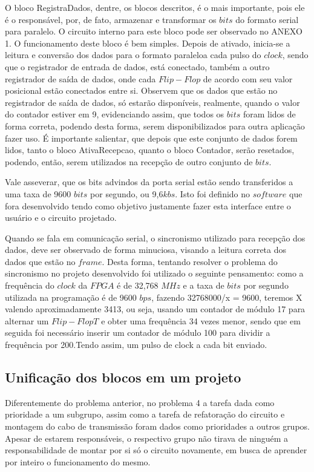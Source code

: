 \documentclass[12pt]{article}
\begin{document}
O bloco RegistraDados, dentre, os blocos descritos, é o mais importante, pois ele é o responsável, por, de fato, armazenar e transformar os $bits$ do formato serial para paralelo. O circuito interno para este bloco pode ser observado no ANEXO 1.  O funcionamento deste bloco é bem simples. Depois de ativado, inicia-se a leitura e conversão dos dados para o formato paraleloa cada pulso do $clock$, sendo que o registrador de entrada de dados, está conectado, também a outro registrador de saída de dados, onde cada $Flip-Flop$ de acordo com seu valor posicional estão conectados entre si. Observem que os dados que estão no registrador de saída de dados, só estarão disponíveis, realmente, quando o valor do contador estiver em 9, evidenciando assim, que todos os $bits$ foram lidos de forma correta, podendo desta forma, serem disponibilizados para outra aplicação fazer uso.  É importante salientar, que depois que este conjunto de dados forem lidos, tanto o bloco AtivaRecepcao, quanto o bloco Contador, serão resetados, podendo, então, serem utilizados na recepção de outro conjunto de $bits$.

Vale asseverar, que os bits advindos da porta serial estão sendo transferidos a uma taxa de 9600 $bits$ por segundo, ou 9,6$kbs$. Isto foi definido no $software$ que fora desenvolvido tendo como objetivo justamente fazer esta interface entre o usuário e o circuito projetado.

Quando se fala em comunicação serial, o sincronismo utilizado para recepção dos dados, deve ser observado de forma minuciosa, visando a leitura correta dos dados que estão no $frame$.  Desta forma, tentando resolver o problema do sincronismo no projeto desenvolvido foi utilizado o seguinte pensamento: como a frequência do $clock$ da $FPGA$ é de 32,768 $MHz$ e a taxa de $bits$ por segundo utilizada na programação é de 9600 $bps$, fazendo 32768000/x = 9600, teremos X valendo aproximadamente 3413, ou seja, usando um contador de módulo 17 para alternar um $Flip-Flop T$ e obter uma frequência 34 vezes menor, sendo que em seguida foi necessário inserir um contador de módulo 100 para dividir a frequência por 200.Tendo assim, um pulso de clock a cada bit enviado.

\subsection{Unificação dos blocos em um projeto}

Diferentemente do problema anterior, no problema 4 a tarefa dada como prioridade a um subgrupo, assim como a tarefa de refatoração do circuito e montagem do cabo de transmissão foram dados como prioridades a outros grupos. Apesar de estarem responsáveis, o respectivo grupo não tirava de ninguém a responsabilidade de montar por si só o circuito novamente, em busca de aprender por inteiro o funcionamento do mesmo.
\end{document}
